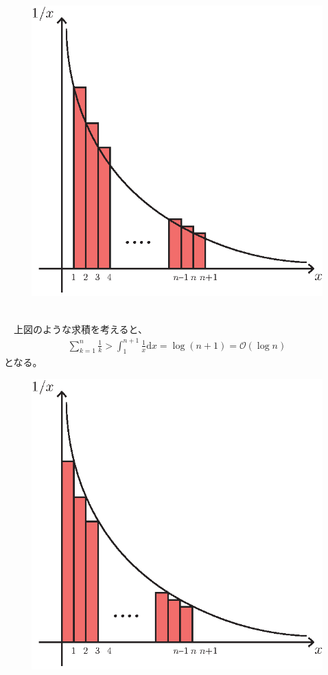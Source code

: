 \documentclass[a4paper,10.5pt]{ltjsarticle}
\begin{document}
\begin{figure}[h]
  \centering
  \includegraphics{figure1.eps}
\end{figure}\\
　上図のような求積を考えると、
\begin{align}
  \sum^{n}_{k=1}{\frac{1}{k}}>\int^{n+1}_{1}{\frac{1}{x}}\mathrm{d}x=\log{(n+1)}=\mathcal{O}(\log{n})
\end{align}
となる。
\begin{figure}[h]
  \centering
  \includegraphics{figure2.eps}
\end{figure}\\
\end{document}
